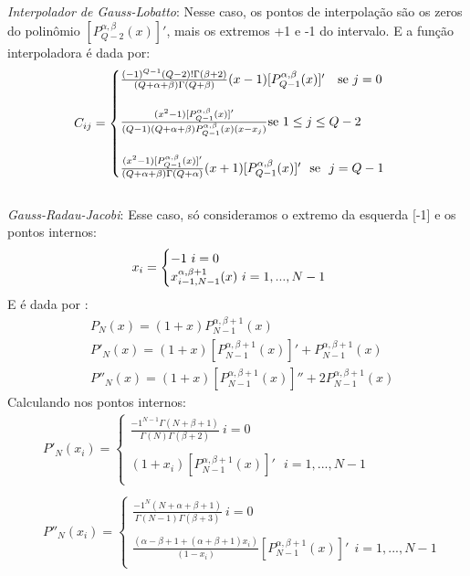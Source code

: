  \emph{Interpolador de Gauss-Lobatto}: Nesse caso, os pontos de interpolação são os zeros do polinômio $[P^{\alpha,\beta}_{Q-2}(x)]'$, mais os extremos +1 e -1 do intervalo. E a função interpoladora é dada por:
\begin{equation}
 C_{ij}= 
\begin{cases}
 \frac{(-1)^{Q - 1}(Q-2)!\Gamma(\beta +2)}{(Q + \alpha + \beta)\Gamma(Q + \beta)}(x-1)[P^{\alpha,\beta}_{Q-1}(x)]'\  \  \ \text{se}\  j = 0 \\\\
 \frac{(x^2 -1)[P^{\alpha,\beta}_{Q-1}(x)]'}{(Q-1)(Q + \alpha + \beta)P^{\alpha,\beta}_{Q-1}(x)(x-x_j)} \text{se}\  1 \leq j \leq Q-2\\\\
 \frac{(x^2 -1)[P^{\alpha,\beta}_{Q-1}(x)]'}{(Q + \alpha + \beta)\Gamma(Q+\alpha)}(x+1)[P^{\alpha,\beta}_{Q-1}(x)]' \ \ \text{se} \ \ j = Q - 1
\end{cases}\\
\end{equation} 
\\
 \emph{Gauss-Radau-Jacobi}: Esse caso, só consideramos o extremo da esquerda [-1] e os pontos internos:
 \begin{equation}
 x_{i}= 
\begin{cases}
 -1 \ i = 0\\
 x^{\alpha,\beta +1}_{i-1,N-1}(x) \ i= 1,...,N-1\\
\end{cases}\\
 \end{equation}
 E é dada por :
 \begin{align}
  & P_{N}(x) = (1+x)P^{\alpha,\beta+1}_{N -1}(x)\\
  & P'_{N}(x) = (1+x)[P^{\alpha,\beta+1}_{N -1}(x)]' + P^{\alpha,\beta+1}_{N -1}(x)\\
  & P''_{N}(x) = (1+x)[P^{\alpha,\beta+1}_{N -1}(x)]'' + 2P^{\alpha,\beta+1}_{N -1}(x)
 \end{align}
 Calculando nos pontos internos:
 \begin{align}
  & P'_{N}(x_i)= 
\begin{cases}
 \frac{-1^{N-1}\Gamma(N+\beta+1)}{\Gamma(N)\Gamma(\beta+2)} \ i =0\\ \\
 (1+x_i)[P^{\alpha,\beta+1}_{N -1}(x)]' \ \ \ i= 1,...,N-1\\ 
\end{cases}\\ \\
  & P''_{N}(x_i)= 
\begin{cases}
 \frac{-1^{N} (N+\alpha+\beta+1)}{\Gamma(N-1)\Gamma(\beta+3)} \ i =0\\  \\
 \frac{(\alpha -\beta +1+(\alpha+\beta+1)x_i)}{(1-x_i)}[P^{\alpha,\beta+1}_{N -1}(x)]' \ \ i= 1,...,N-1\\
\end{cases}\\
 \end{align}\\
